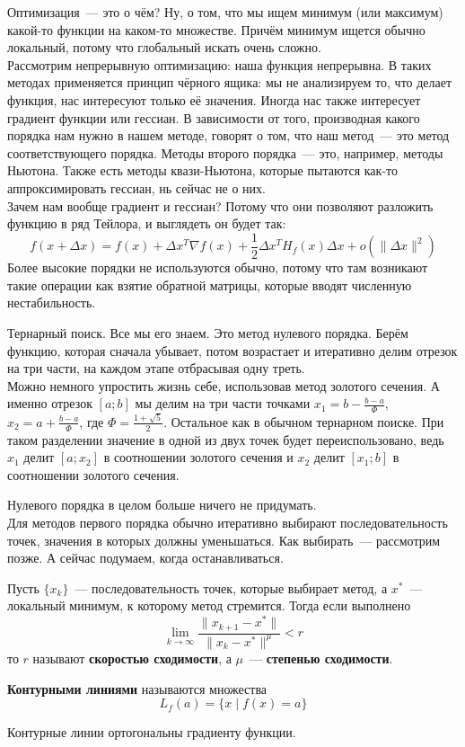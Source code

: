 \documentclass{article}
\begin{document}
    \noindent Оптимизация~--- это о чём? Ну, о том, что мы ищем минимум (или максимум) какой-то функции на каком-то множестве. Причём минимум ищется обычно локальный, потому что глобальный искать очень сложно.\\
    Рассмотрим непрерывную оптимизацию: наша функция непрерывна. В таких методах применяется принцип чёрного ящика: мы не анализируем то, что делает функция, нас интересуют только её значения. Иногда нас также интересует градиент функции или гессиан. В зависимости от того, производная какого порядка нам нужно в нашем методе, говорят о том, что наш метод~--- это метод соответствующего порядка. Методы второго порядка~--- это, например, методы Ньютона. Также есть методы квази-Ньютона, которые пытаются как-то аппроксимировать гессиан, нь сейчас не о них.\\
    Зачем нам вообще градиент и гессиан? Потому что они позволяют разложить функцию в ряд Тейлора, и выглядеть он будет так:
    \[
    f(x+\Delta x)=f(x)+\Delta x^T\nabla f(x)+\frac12\Delta x^TH_f(x)\Delta x+o(\|\Delta x\|^2)
    \]
    Более высокие порядки не используются обычно, потому что там возникают такие операции как взятие обратной матрицы, которые вводят численную нестабильность.
    \begin{example}
        Тернарный поиск. Все мы его знаем. Это метод нулевого порядка. Берём функцию, которая сначала убывает, потом возрастает и итеративно делим отрезок на три части, на каждом этапе отбрасывая одну треть.\\
        Можно немного упростить жизнь себе, использовав метод золотого сечения. А именно отрезок $[a;b]$ мы делим на три части точками $x_1=b-\frac{b-a}\Phi$, $x_2=a+\frac{b-a}\Phi$, где $\Phi=\frac{1+\sqrt5}2$. Остальное как в обычном тернарном поиске. При таком разделении значение в одной из двух точек будет переиспользовано, ведь $x_1$ делит $[a;x_2]$ в соотношении золотого сечения и $x_2$ делит $[x_1;b]$ в соотношении золотого сечения.
    \end{example}\noindent
    Нулевого порядка в целом больше ничего не придумать.\\
    Для методов первого порядка обычно итеративно выбирают последовательность точек, значения в которых должны уменьшаться. Как выбирать~--- рассмотрим позже. А сейчас подумаем, когда останавливаться.
    \begin{definition}
        Пусть $\{x_k\}$~--- последовательность точек, которые выбирает метод, а $x^*$~--- локальный минимум, к которому метод стремится. Тогда если выполнено
        \[
        \lim\limits_{k\to\infty}\frac{\|x_{k+1}-x^*\|}{\|x_k-x^*\|^\mu}<r
        \]
        то $r$ называют \textbf{скоростью сходимости}, а $\mu$~--- \textbf{степенью сходимости}.
    \end{definition}
    \begin{definition}
        \textbf{Контурными линиями} называются множества
        \[
        L_f(a)=\{x\mid f(x)=a\}
        \]
    \end{definition}
    \begin{claim}
        Контурные линии ортогональны градиенту функции.
    \end{claim}
\end{document}
